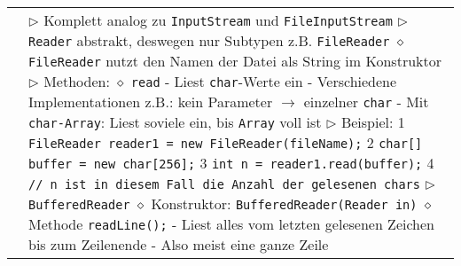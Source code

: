 \begin{longtable}{ | p{} p{} | }
	\makecell[l]{Textdaten lesen} & \makecell[l]{
	$\rhd$ Komplett analog zu \texttt{InputStream} und \texttt{FileInputStream} \\
	$\rhd$ \texttt{Reader} abstrakt, deswegen nur Subtypen z.B. \texttt{FileReader} \\
	\hspace{0.4cm} $\diamond$ \texttt{FileReader} nutzt den Namen der Datei als String im Konstruktor \\
	$\rhd$ Methoden: \\
	\hspace{0.4cm} $\diamond$ \texttt{read} \\
	\hspace{0.6cm} - Liest \texttt{char}-Werte ein \\
	\hspace{0.6cm} - Verschiedene Implementationen z.B.: kein Parameter $\rightarrow$ einzelner \texttt{char} \\
	\hspace{0.6cm} - Mit \texttt{char-Array}: Liest soviele ein, bis \texttt{Array} voll ist \\
	$\rhd$ Beispiel: \\
	\hspace{0.4cm} 1 \hspace{0.1cm} \texttt{FileReader reader1 = new FileReader(fileName);} \\
	\hspace{0.4cm} 2 \hspace{0.1cm} \texttt{char[] buffer = new char[256];} \\
	\hspace{0.4cm} 3 \hspace{0.1cm} \texttt{int n = reader1.read(buffer);} \\
	\hspace{0.4cm} 4 \hspace{0.1cm} \texttt{// n ist in diesem Fall die Anzahl der gelesenen chars} \\
	$\rhd$ \texttt{BufferedReader} \\
	\hspace{0.4cm} $\diamond$ Konstruktor: \texttt{BufferedReader(Reader in)} \\
	\hspace{0.4cm} $\diamond$ Methode \texttt{readLine();} \\
	\hspace{0.6cm} - Liest alles vom letzten gelesenen Zeichen bis zum Zeilenende \\
	\hspace{0.6cm} - Also meist eine ganze Zeile \\
}
\end{longtable}
